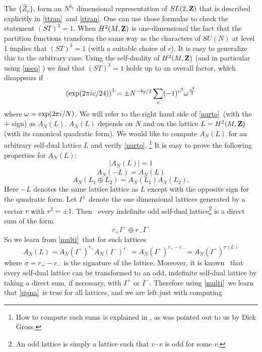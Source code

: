 \documentclass[12pt]{article}
\numberwithin{equation}{section}
\def\bar{\overline}
\begin{document}
The $\{ \hat Z_v\} $, form an $N^{b_2}$
dimensional representation of $SL(2,{\bf Z})$ that is described explicitly
in \eqref{ttran}\ and \eqref{stran}. One can use those formulas to
check the statement
$(ST)^3=1$.  When $H^2(M,{\bf Z})$ is one-dimensional the fact that
the partition functions transform the same way as the
characters of $SU(N)$ at level 1 implies that
$(ST)^3=1$ (with a suitable choice of $c$).   It is easy
to generalize this to the arbitrary case.
Using the self-duality of $H^2(M,{\bf Z})$ (and in particular
using \eqref{useq} )
we find that $(ST)^3=1$ holds
up to an overall factor, which disappears if
%
\begin{equation}
  \label{nurto}
  \left({\rm exp}(2\pi i c/24)\right)^3=\pm N^{-b_2/2}\sum_v
  (-1)^{v^2}\omega^{v^2\over 2}
\end{equation}
%
where $\omega ={\rm exp}(2\pi i/N)$.  We will refer to the right
hand side of \eqref{nurto}\ (with the $+$ sign) as $A_N(L)$.  $A_N(L)$
depends on $N$ and on the lattice $L=H^2(M,{\bf Z})$ (with its canonical
quadratic form).  We would like to compute $A_N(L)$ for an arbitrary
self-dual lattice $L$  and verify \eqref{nurto}. \footnote{How to
  compute such sums is explained in \cite{serre}, as was pointed out to
us by Dick Gross.}
It is easy to prove the following properties
for $A_N(L)$:
%
$$\big| A_N(L) \big|=1$$
$$A_N(-L)=\bar{A_N(L)}$$
\begin{equation}
  \label{multi}
  A_N(L_1\oplus L_2)=A_N(L_1)A_N(L_2).
\end{equation}
%
Here $-L$ denotes the same lattice lattice as $L$ except
with the opposite
sign for the quadratic form.
Let $I^{\pm}$ denote the one dimensional lattices
generated by a vector $v$ with $v^2={\pm 1}$.
Then \cite{serre}\ every indefinite odd
self-dual lattice\footnote{An odd lattice is simply a lattice such
that $v\cdot v$ is odd for some $v$.}
is a direct sum of the form
%
$$r_+ I^+ \oplus r_- I^-$$
%
So we learn from \eqref{multi}\ that for such lattices
%
\begin{equation}
  \label{signa}
  A_N(L)=A_N(I^+)^{r_+}A_N(I^-)^{r_-} =A_N(I^+)^{r_+-r_-}=A_N(I^+)^{\sigma (L)}
\end{equation}
%
where $\sigma =r_+-r_-$ is the signature of the lattice.
Moreover, it is known \cite{serre}\ that every self-dual lattice
can be transformed to an odd, indefinite self-dual lattice
by taking a direct sum,
if necessary, with  $I^+$ or $I^-$.  Therefore using \eqref{multi}\ we learn
that \eqref{signa}\ is true for all lattices, and we are left just
with computing
\end{document}
